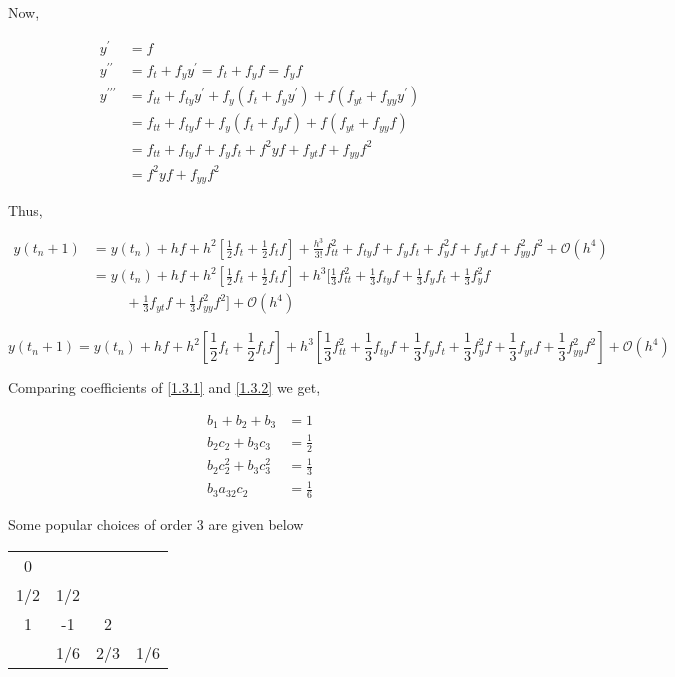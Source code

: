 \documentclass[12pt,a4paper]{article}
\begin{document}
Now, 

\begin{align*}
y^\prime &= f \\
y^{\prime\prime} &= f_t + f_yy^\prime = f_t + f_yf = f_yf \\
y^{\prime\prime\prime} &= f_{tt} + f_{ty}y^\prime + f_y(f_t + f_yy^\prime) + f(f_{yt} + f_{yy}y^\prime) \\
&= f_{tt} + f_{ty}f + f_y(f_t + f_yf) + f(f_{yt} + f_{yy}f)\\
&= f_{tt} + f_{ty}f + f_yf_t + f^2yf + f_{yt}f + f_{yy}f^2 \\
&= f^2yf + f_{yy}f^2 
\end{align*}

Thus, 

\begin{align*}
y(t_n + 1) &= y(t_n) + hf + h^2[\frac{1}{2}f_t + \frac{1}{2} f_tf] + \frac{h^3}{3!}f_{tt}^2 + f_{ty} f + f_y f_t + f_y^2f + f_{yt}f+ f_{yy}^2f^2 + \mathcal{O}(h^4)  \\
&= y(t_n) + hf+ h^2[\frac{1}{2}f_t + \frac{1}{2}f_tf] + h^3[\frac{1}{3}f_{tt}^2 + \frac{1}{3}f_{ty} f + \frac{1}{3} f_y f_t + \frac{1}{3}f_y^2f \\
&\hspace{1cm} + \frac{1}{3}f_{yt}f+ \frac{1}{3}f_{yy}^2f^2] + \mathcal{O}(h^4)
\end{align*}

\begin{equation}\tag{1.3.2}\label{1.3.2}
y(t_n + 1) = y(t_n) + hf+ h^2[\frac{1}{2}f_t + \frac{1}{2}f_tf] + h^3[\frac{1}{3}f_{tt}^2 + \frac{1}{3}f_{ty} f + \frac{1}{3} f_y f_t + \frac{1}{3}f_y^2f + \frac{1}{3}f_{yt}f+ \frac{1}{3}f_{yy}^2f^2] + \mathcal{O}(h^4)
\end{equation}

Comparing coefficients of \ref{1.3.1} and \ref{1.3.2} we get,

\begin{align*}
b_1 + b_2 + b_3 &= 1 \\ 
b_2c_2 + b_3c_3 &= \frac{1}{2} \\
b_2c_2^2 + b_3c_3^2 &= \frac{1}{3} \\
b_3a_{32}c_2 &= \frac{1}{6}
\end{align*}

Some popular choices of order 3 are given below

\begin{center}
\begin{tabular}{c|ccc}
0\\
1/2&1/2\\
1&-1&2\\
\hline
&1/6&2/3&1/6
\end{tabular}
\end{center}
\end{document}
